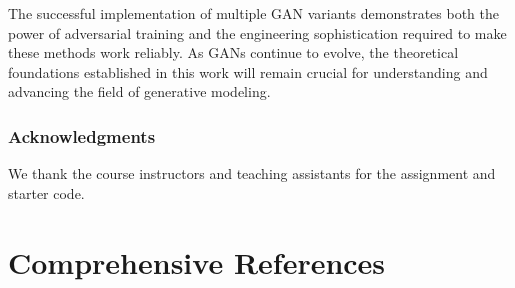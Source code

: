 \documentclass{article}
\begin{document}
The successful implementation of multiple GAN variants demonstrates both the power of adversarial training and the engineering sophistication required to make these methods work reliably. As GANs continue to evolve, the theoretical foundations established in this work will remain crucial for understanding and advancing the field of generative modeling.

\subsubsection*{Acknowledgments}
We thank the course instructors and teaching assistants for the assignment and starter code.

\section*{Comprehensive References}
\end{document}
